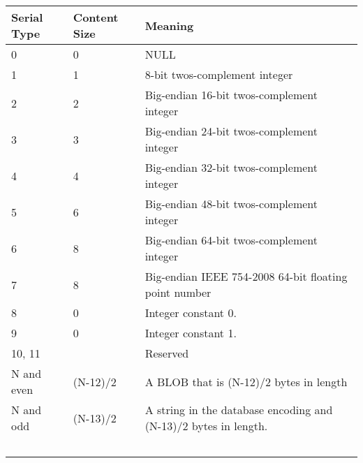 \documentclass{article}
\begin{document}
\begin{table}     
  \begin{tabular}{|l|l|l|}         
    \hline         Serial Type   & Content Size & Meaning                                                                                            
\\ \hline         0             & 0            & NULL                                                                                            \\         1             & 1            & 8-bit twos-complement integer                                                                   \\         2             & 2            & Big-endian 16-bit twos-complement integer                                                       \\         3             & 3            & Big-endian 24-bit twos-complement integer                                                       \\         4             & 4            & Big-endian 32-bit twos-complement integer                                                       \\         5             & 6            & Big-endian 48-bit twos-complement integer                                                       \\         6             & 8            & Big-endian 64-bit twos-complement integer                                                       \\         7             & 8            & Big-endian IEEE 754-2008 64-bit floating point number                                           \\         8             & 0            & Integer constant 0.                                                                             \\         9             & 0            & Integer constant 1.                                                                             \\         10, 11        & ~            & Reserved                                                                                        \\         N\geq12 and even & (N-12)/2     & A BLOB that is (N-12)/2 bytes in length                                                         \\         N\geq13 and odd  & (N-13)/2     & A string in the database encoding and (N-13)/2 bytes in length. 
\\         ~             & ~            & ~                                                                                               
\\         
\hline     
\end{tabular} 
\end{table} 
\end{document}
